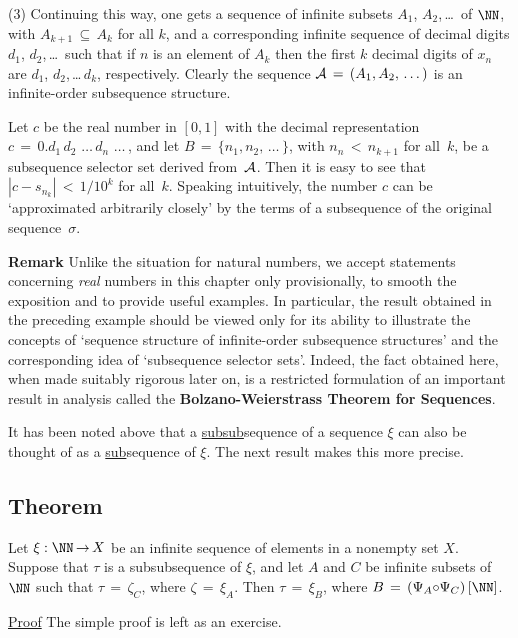 {       (3) Continuing this way, one gets a sequence of infinite subsets $A_{1}$, $A_{2}$,\,{\ldots}\, of ${\NN}$,
    with $A_{k+1} \,{\subseteq}\, A_{k}$ for all $k$, and a corresponding infinite sequence of decimal digits $d_{1}$, $d_{2}$,\,{\ldots}\,
    such that if $n$ is an element of $A_{k}$ then the first $k$ decimal digits of $x_{n}$ are $d_{1}$, $d_{2}$,\,{\ldots}\,$d_{k}$, respectively.
    Clearly the sequence ${\cal A} \,=\, (A_{1}, A_{2},\,{\ldots}\,)$ is an infinite-order subsequence structure.

        Let $c$ be the real number in $[0,1]$ with the decimal representation $c \,=\, 0.d_{1}\,d_{2}\,\,{\ldots}\,d_{n}\,\,{\ldots}\,$,
    and let $B \,=\, \{n_{1}, n_{2},\,{\ldots}\,\}$, with $n_{n}\,<\,n_{k+1}$ for all~$k$, be a subsequence selector set derived from~${\cal A}$.
    Then it is easy to see that $|c-s_{n_{k}}|\,<\,1/10^{k}$ for all~$k$. Speaking intuitively,
    the number $c$ can be `approximated arbitrarily closely' by the terms of a subsequence of the original sequence~${\sigma}$.


        {\bf Remark} Unlike the situation for natural numbers, we accept statements concerning {\em real} numbers in this chapter only provisionally,
    to smooth the exposition and to provide useful examples. In particular, the result obtained in the preceding example
    should be viewed only for its ability to illustrate the concepts of `sequence structure of infinite-order subsequence structures'
    and the corresponding idea of `subsequence selector sets'. Indeed, the fact obtained here,
    when made suitably rigorous later on, is a restricted formulation of an important result in analysis called
    the {\bf Bolzano-Weierstrass Theorem for Sequences}.


\V
\V

        It has been noted above that a \underline{subsub}sequence of a sequence ${\xi}$ can also be thought of as a \underline{sub}sequence of ${\xi}$.
    The next result makes this more precise.

\V

        \subsection{\small{{\bf Theorem}}}
        \label{ThmA40.90}

\V

        Let ${\xi}:{\NN} \,{\rightarrow}\, X$ be an infinite sequence of elements in a nonempty set $X$.
    Suppose that ${\tau}$ is a subsubsequence of ${\xi}$, and let $A$ and $C$ be infinite subsets of ${\NN}$ such that ${\tau} \,=\, {\zeta}_{C}$, where ${\zeta} \,=\, {\xi}_{A}$.
    Then ${\tau} \,=\, {\xi}_{B}$, where $B \,=\, \left({\Psi}_{A}{\circ}{\Psi}_{C}\right)[{\NN}]$.

\V

        \underline{Proof} The simple proof is left as an exercise.
}%

